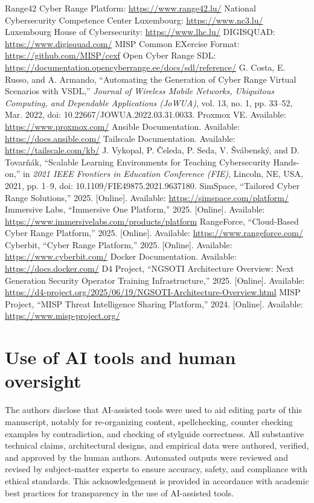 \documentclass[11pt]{article}
\begin{document}

\begin{thebibliography}{99}
 Range42 Cyber Range Platform: \url{https://www.range42.lu/}
 National Cybersecurity Competence Center Luxembourg: \url{https://www.nc3.lu/}
 Luxembourg House of Cybersecurity: \url{https://www.lhc.lu/}
 DIGISQUAD: \url{https://www.digisquad.com/}
 MISP Common EXercise Format: \url{https://github.com/MISP/cexf}
 Open Cyber Range SDL: \url{https://documentation.opencyberrange.ee/docs/sdl/reference/}
 G. Costa, E. Russo, and A. Armando, 
``Automating the Generation of Cyber Range Virtual Scenarios with VSDL,'' 
\textit{Journal of Wireless Mobile Networks, Ubiquitous Computing, and Dependable Applications (JoWUA)}, 
vol. 13, no. 1, pp. 33--52, Mar. 2022, 
doi: 10.22667/JOWUA.2022.03.31.0033.
 Proxmox VE. Available: \url{https://www.proxmox.com/}
 Ansible Documentation. Available: \url{https://docs.ansible.com/}
 Tailscale Documentation. Available: \url{https://tailscale.com/kb/}
 J. Vykopal, P. \v{C}eleda, P. Seda, V. \v{S}v\'{a}bensk\'{y}, and D. Tovar\v{n}\'{a}k,
``Scalable Learning Environments for Teaching Cybersecurity Hands-on,''
in \textit{2021 IEEE Frontiers in Education Conference (FIE)},
Lincoln, NE, USA, 2021, pp. 1--9, doi: 10.1109/FIE49875.2021.9637180.
 SimSpace, ``Tailored Cyber Range Solutions,'' 2025. [Online]. Available: \url{https://simspace.com/platform/}
 Immersive Labs, ``Immersive One Platform,'' 2025. [Online]. Available: \url{https://www.immersivelabs.com/products/platform}
 RangeForce, ``Cloud-Based Cyber Range Platform,'' 2025. [Online]. Available: \url{https://www.rangeforce.com/}
 Cyberbit, ``Cyber Range Platform,'' 2025. [Online]. Available: \url{https://www.cyberbit.com/}
 Docker Documentation. Available: \url{https://docs.docker.com/}
 D4 Project, ``NGSOTI Architecture Overview: Next Generation Security Operator Training Infrastructure,'' 2025. [Online]. Available: \url{https://d4-project.org/2025/06/19/NGSOTI-Architecture-Overview.html}
 MISP Project, ``MISP Threat Intelligence Sharing Platform,'' 2024. [Online]. Available: \url{https://www.misp-project.org/}
\end{thebibliography}


\section*{Use of AI tools and human oversight}
The authors disclose that AI-assisted tools were used to aid editing parts of this manuscript, notably for re-organizing content, spellchecking, counter checking examples by contradiction, and checking of stylguide correctness.
All substantive technical claims, architectural designs, and empirical data were authored, verified, and approved by the human authors.
Automated outputs were reviewed and revised by subject-matter experts to ensure accuracy, safety, and compliance with ethical standards.
This acknowledgement is provided in accordance with academic best practices for transparency in the use of AI-assisted tools.
\end{document}
